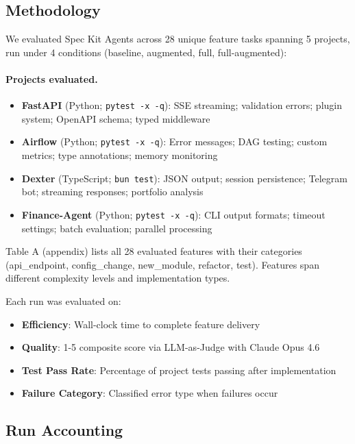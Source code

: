\documentclass[sigconf,anonymous,review]{acmart}
\begin{document}
\subsection{Methodology}

We evaluated Spec Kit Agents across 28 unique feature tasks spanning 5 projects, run under 4 conditions (baseline, augmented, full, full-augmented):

\paragraph{Projects evaluated.}
\begin{itemize}
  \item \textbf{FastAPI} (Python; \texttt{pytest -x -q}): SSE streaming; validation errors; plugin system; OpenAPI schema; typed middleware
  \item \textbf{Airflow} (Python; \texttt{pytest -x -q}): Error messages; DAG testing; custom metrics; type annotations; memory monitoring
  \item \textbf{Dexter} (TypeScript; \texttt{bun test}): JSON output; session persistence; Telegram bot; streaming responses; portfolio analysis
  \item \textbf{Finance-Agent} (Python; \texttt{pytest -x -q}): CLI output formats; timeout settings; batch evaluation; parallel processing
\end{itemize}

Table A (appendix) lists all 28 evaluated features with their categories (api\_endpoint, config\_change, new\_module, refactor, test). Features span different complexity levels and implementation types.

Each run was evaluated on:
\begin{itemize}
  \item \textbf{Efficiency}: Wall-clock time to complete feature delivery
  \item \textbf{Quality}: 1-5 composite score via LLM-as-Judge with Claude Opus 4.6
  \item \textbf{Test Pass Rate}: Percentage of project tests passing after implementation
  \item \textbf{Failure Category}: Classified error type when failures occur
\end{itemize}

\subsection{Run Accounting}
\end{document}
